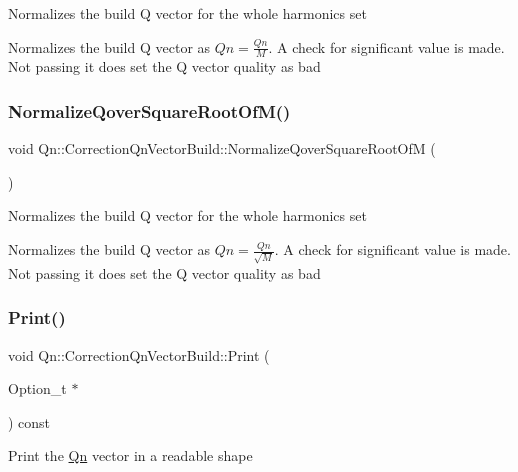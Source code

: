 Normalizes the build Q vector for the whole harmonics set

Normalizes the build Q vector as $ Qn = \frac{Qn}{M} $. A check for significant value is made. Not passing it does set the Q vector quality as bad \mbox{\label{classQn_1_1CorrectionQnVectorBuild_a64644f0c2f52f98399db120028574fd3}} 
\subsubsection{\texorpdfstring{Normalize\+Qover\+Square\+Root\+Of\+M()}{NormalizeQoverSquareRootOfM()}}
{\footnotesize\ttfamily void Qn\+::\+Correction\+Qn\+Vector\+Build\+::\+Normalize\+Qover\+Square\+Root\+OfM (\begin{DoxyParamCaption}{ }\end{DoxyParamCaption})}

Normalizes the build Q vector for the whole harmonics set

Normalizes the build Q vector as $ Qn = \frac{Qn}{\sqrt{M}} $. A check for significant value is made. Not passing it does set the Q vector quality as bad \mbox{\label{classQn_1_1CorrectionQnVectorBuild_a8b767040ac4ae2472e8ce8f091b5ce88}} 
\subsubsection{\texorpdfstring{Print()}{Print()}}
{\footnotesize\ttfamily void Qn\+::\+Correction\+Qn\+Vector\+Build\+::\+Print (\begin{DoxyParamCaption}\item[{Option\+\_\+t $\ast$}]{ }\end{DoxyParamCaption}) const\hspace{0.3cm}{\ttfamily [virtual]}}

Print the \mbox{\hyperlink{namespaceQn}{Qn}} vector in a readable shape 

